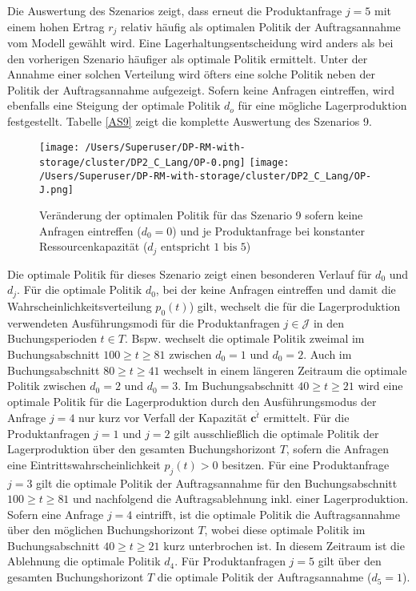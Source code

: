 Die Auswertung des Szenarios zeigt, dass erneut die Produktanfrage $j=5$ mit einem hohen Ertrag $r_j$ relativ häufig als optimalen Politik der Auftragsannahme vom Modell gewählt wird. Eine Lagerhaltungsentscheidung wird anders als bei den vorherigen Szenario häufiger als optimale Politik ermittelt. Unter der Annahme einer solchen Verteilung wird öfters eine solche Politik neben der Politik der Auftragsannahme aufgezeigt. Sofern keine Anfragen eintreffen, wird ebenfalls eine Steigung der optimale Politik $d_o$ für eine mögliche Lagerproduktion festgestellt. Tabelle \ref{AS9} zeigt die komplette Auswertung des Szenarios 9.\\[.5cm]

\begin{figure}[h!]     
\begin{center}
\texttt{[image: /Users/Superuser/DP-RM-with-storage/cluster/DP2\_C\_Lang/OP-0.png]}
\texttt{[image: /Users/Superuser/DP-RM-with-storage/cluster/DP2\_C\_Lang/OP-J.png]}
    \caption{Veränderung der optimalen Politik für das Szenario 9 sofern keine Anfragen eintreffen ($d_0=0$) und je Produktanfrage bei konstanter Ressourcenkapazität ($d_j\text{ entspricht }1\text{ bis }5$)}  \label{SV9}
  \end{center}
\end{figure}

Die optimale Politik für dieses Szenario zeigt einen besonderen Verlauf für $d_0$ und $d_j$. Für die optimale Politik $d_0$, bei der keine Anfragen eintreffen und damit die Wahrscheinlichkeitsverteilung $p_0(t)$) gilt, wechselt die für die Lagerproduktion verwendeten Ausführungsmodi für die Produktanfragen $j\in\mathcal{J}$ in den Buchungsperioden $ t \in T$. Bspw. wechselt die optimale Politik zweimal im Buchungsabschnitt $100\ge t\ge81$ zwischen $d_0=1$ und $d_0=2$. Auch im Buchungsabschnitt $80\ge t\ge41$ wechselt in einem längeren Zeitraum die optimale Politik zwischen $d_0=2$ und $d_0=3$. Im Buchungsabschnitt $40\ge t\ge21$ wird eine optimale Politik für die Lagerproduktion durch den Ausführungsmodus der Anfrage $j=4$ nur kurz vor Verfall der Kapazität $\textbf{c}^{\hat t}$ ermittelt. Für die Produktanfragen $j=1$ und $j=2$ gilt ausschließlich die optimale Politik der Lagerproduktion über den gesamten Buchungshorizont $T$, sofern die Anfragen eine Eintrittswahrscheinlichkeit $p_j(t)>0$ besitzen. Für eine Produktanfrage $j=3$ gilt die optimale Politik der Auftragsannahme für den Buchungsabschnitt $100\ge t\ge81$ und nachfolgend die Auftragsablehnung inkl. einer Lagerproduktion. Sofern eine Anfrage $j=4$ eintrifft, ist die optimale Politik die Auftragsannahme über den möglichen Buchungshorizont $T$, wobei diese optimale Politik im Buchungsabschnitt $40\ge t\ge21$ kurz unterbrochen ist. In diesem Zeitraum ist die Ablehnung die optimale Politik $d_4$. Für Produktanfragen $j=5$ gilt über den gesamten Buchungshorizont $T$ die optimale Politik der Auftragsannahme ($d_5=1$). 




